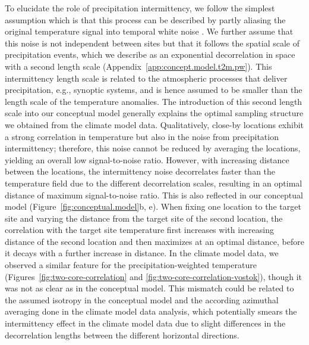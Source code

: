 \documentclass[draft]{agujournal2019}
\begin{document}
To elucidate the role of precipitation intermittency, we follow the simplest
assumption which is that this process can be described by partly aliasing the
original temperature signal into temporal white noise
\cite{Laepple2018,Casado2020}. We further assume that this noise is not
independent between sites but that it follows the spatial scale of precipitation
events, which we describe as an exponential decorrelation in space with a second
length scale (Appendix~\ref{app:concept.model.t2m.pw}). This intermittency
length scale is related to the atmospheric processes that deliver precipitation,
e.g., synoptic systems, and is hence assumed to be smaller than the length scale
of the temperature anomalies. The introduction of this second length scale into
our conceptual model generally explains the optimal sampling structure we
obtained from the climate model data. Qualitatively, close-by locations exhibit
a strong correlation in temperature but also in the noise from precipitation
intermittency; therefore, this noise cannot be reduced by averaging the
locations, yielding an overall low signal-to-noise ratio. However, with
increasing distance between the locations, the intermittency noise decorrelates
faster than the temperature field due to the different decorrelation scales,
resulting in an optimal distance of maximum signal-to-noise ratio. This is also
reflected in our conceptual model (Figure~\ref{fig:conceptual.model}b, e). When
fixing one location to the target site and varying the distance from the target
site of the second location, the correlation with the target site temperature
first increases with increasing distance of the second location and then
maximizes at an optimal distance, before it decays with a further increase in
distance. In the climate model data, we observed a similar feature for the
precipitation-weighted temperature (Figures~\ref{fig:two-core-correlation} and
\ref{fig:two-core-correlation-vostok}), though it was not as clear as in the
conceptual model. This mismatch could be related to the assumed isotropy in the
conceptual model and the according azimuthal averaging done in the climate model
data analysis, which potentially smears the intermittency effect in the climate
model data due to slight differences in the decorrelation lengths between the
different horizontal directions.
\end{document}
